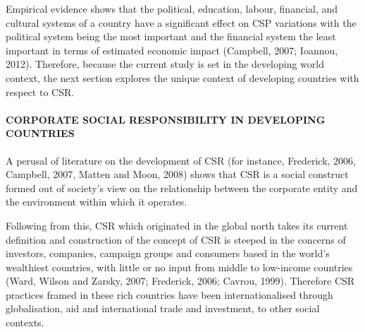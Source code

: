 \documentclass[
]{mitthesis}
\begin{document}
Empirical evidence shows that the political, education, labour, financial, and cultural systems of a country have a significant effect on CSP variations with the political system being the most important and the financial system the least important in terms of estimated economic impact (Campbell, 2007; Ioannou, 2012). Therefore, because the current study is set in the developing world context, the next section explores the unique context of developing countries with respect to CSR.

\hypertarget{corporate-social-responsibility-in-developing-countries}{%
\paragraph{CORPORATE SOCIAL RESPONSIBILITY IN DEVELOPING COUNTRIES}\label{corporate-social-responsibility-in-developing-countries}}

A perusal of literature on the development of CSR (for instance, Frederick, 2006, Campbell, 2007, Matten and Moon, 2008) shows that CSR is a social construct formed out of society's view on the relationship between the corporate entity and the environment within which it operates.

Following from this, CSR which originated in the global north takes its current definition and construction of the concept of CSR is steeped in the concerns of investors, companies, campaign groups and consumers based in the world's wealthiest countries, with little or no input from middle to low-income countries (Ward, Wilson and Zarsky, 2007; Frederick, 2006; Cavrou, 1999). Therefore CSR practices framed in these rich countries have been internationalised through globalisation, aid and international trade and investment, to other social contexts.
\end{document}
